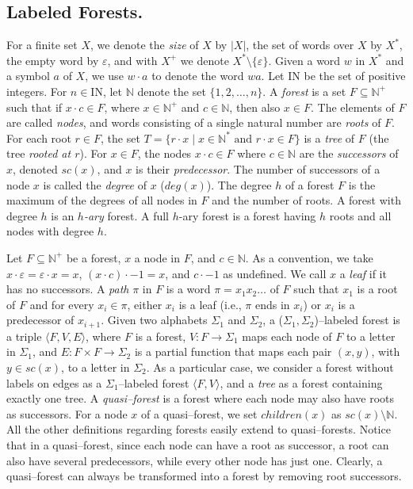 \documentclass{LMCS}
\theoremstyle{plain}
\def \edge          {E}
\def \Nat           {\mathbb{N}}
\def \Naturals      {\mbox{I$\!$N}}
\def \node          {V}
\newcommand \tpl[1] {\langle #1 \rangle}
\begin{document}
\subsection{Labeled Forests.}\label{sub:LabeledForests} For a
finite set $X$, we denote the \emph{size} of $X$ by $|X|$, the set
of words over $X$ by $X^*$, the empty word by $\varepsilon$, and
with $X^+$ we denote $X^* \setminus \{\varepsilon\}$. Given a word
$w$ in $X^*$ and a symbol $a$ of $X$, we use $w \cdot a$ to denote
the word $wa$. Let $\Naturals$ be the set of positive integers.
For $n \in \Naturals$, let $\Nat$ denote the set $\{1,2,\ldots,
n\}$. A \emph{forest} is a set $F \subseteq \Nat^+$ such that if
$x \cdot c \in F$, where $x \in \Nat^+$ and $c \in \Nat$, then
also $x \in F$. The elements of $F$ are called \emph{nodes}, and
words consisting of a single natural number are \emph{roots} of
$F$. For each root $r\in F$, the set $T=\{r\cdot x \mid x\in\Nat^*
\mbox{ and } r\cdot x\in F \}$ is a \emph{tree} of $F$ (the tree
\emph{rooted at $r$}). For $x \in F$, the nodes $x \cdot c \in F$
where $c \in \Nat$ are the \emph{successors} of $x$, denoted
$sc(x)$, and $x$ is their \emph{predecessor}. The number of
successors of a node $x$ is called the \emph{degree} of $x$
($deg(x)$). The degree $h$ of a forest $F$ is the maximum of the
degrees of all nodes in $F$ and the number of roots. A forest with
degree $h$ is an \emph{$h$-ary} forest. A full $h$-ary forest is a
forest having $h$ roots and all nodes with degree $h$.

Let $F \subseteq \Nat^+$ be a forest, $x$ a node in $F$, and $c
\in \Nat$. As a convention, we take $x \cdot \varepsilon =
\varepsilon \cdot x = x$, $(x \cdot c) \cdot -1 = x$, and $c \cdot
-1$ as undefined. We call $x$ a \emph{leaf} if it has no
successors. A \emph{path} $\pi$ in $F$ is a word $\pi=x_1 x_2
\ldots$ of $F$ such that $x_1$ is a root of $F$ and for every $x_i
\in \pi$, either $x_i$ is a leaf (i.e., $\pi$ ends in $x_i$) or
$x_{i}$ is a predecessor of $x_{i+1}$. Given two alphabets
$\Sigma_1$ and $\Sigma_2$, a ($\Sigma_1,\Sigma_2$)--labeled forest
is a triple $\tpl{F, \node, \edge}$, where $F$ is a forest, $\node
: F \rightarrow \Sigma_1$ maps each node of $F$ to a letter in
$\Sigma_1$, and $\edge: F \times F \rightarrow \Sigma_2$ is a
partial function that maps each pair $(x, y)$, with $y \in sc(x)$,
to a letter in $\Sigma_2$. As a particular case, we consider a
forest without labels on edges as a $\Sigma_1$--labeled forest
$\tpl{F, \node}$, and a \emph{tree} as a forest containing exactly
one tree. A \emph{quasi--forest} is a forest where each node may
also have roots as successors. For a node $x$ of a quasi--forest,
we set $children(x)$ as $sc(x)\setminus \Nat$. All the other
definitions regarding forests easily extend to quasi--forests.
Notice that in a quasi--forest, since each node can have a root as
successor, a root can also have several predecessors, while every
other node has just one. Clearly, a quasi--forest can always be
transformed into a forest by removing root successors.
\end{document}

